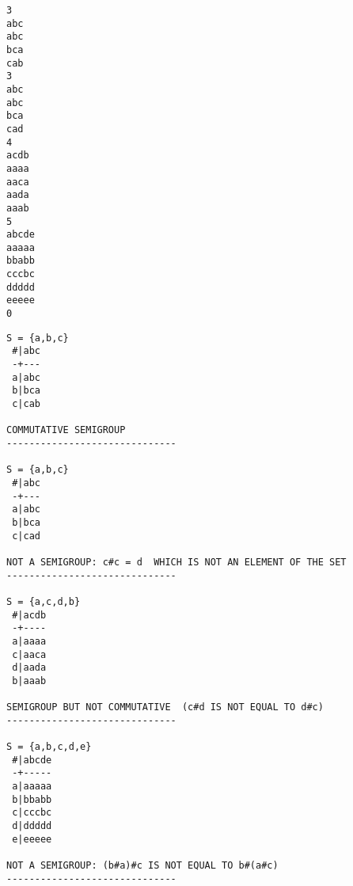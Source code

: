 \bigskip
{}

{\small
\begin{verbatim}
3
abc
abc
bca
cab
3
abc
abc
bca
cad
4
acdb
aaaa
aaca
aada
aaab
5
abcde
aaaaa
bbabb
cccbc
ddddd
eeeee
0
\end{verbatim}
}

\bigskip
{}

{\small
\begin{verbatim}
S = {a,b,c}
 #|abc
 -+---
 a|abc
 b|bca
 c|cab

COMMUTATIVE SEMIGROUP
------------------------------

S = {a,b,c}
 #|abc
 -+---
 a|abc
 b|bca
 c|cad

NOT A SEMIGROUP: c#c = d  WHICH IS NOT AN ELEMENT OF THE SET
------------------------------

S = {a,c,d,b}
 #|acdb
 -+----
 a|aaaa
 c|aaca
 d|aada
 b|aaab

SEMIGROUP BUT NOT COMMUTATIVE  (c#d IS NOT EQUAL TO d#c)
------------------------------

S = {a,b,c,d,e}
 #|abcde
 -+-----
 a|aaaaa
 b|bbabb
 c|cccbc
 d|ddddd
 e|eeeee

NOT A SEMIGROUP: (b#a)#c IS NOT EQUAL TO b#(a#c)
------------------------------
\end{verbatim}
}


